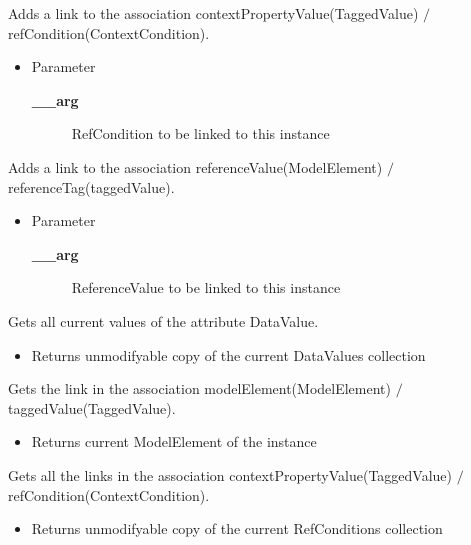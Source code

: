 \begin{desc}Adds a link to the association contextPropertyValue(TaggedValue)
 $/$ refCondition(ContextCondition).
\begin{itemize}
\item{Parameter
  \begin{description}
   \item[{\bf \_\_arg}]{RefCondition to be linked to this instance}
  \end{description}}
\end{itemize}
\end{desc}

\begin{desc}Adds a link to the association referenceValue(ModelElement)
 $/$ referenceTag(taggedValue).
\begin{itemize}
\item{Parameter
  \begin{description}
   \item[{\bf \_\_arg}]{ReferenceValue to be linked to this instance}
  \end{description}}
\end{itemize}
\end{desc}

\begin{desc}Gets all current values of the attribute DataValue.
\begin{itemize}
\item{Returns unmodifyable copy of the current DataValues collection }
\end{itemize}
\end{desc}

\begin{desc}Gets the link in the association modelElement(ModelElement)
 $/$ taggedValue(TaggedValue).
\begin{itemize}
\item{Returns current ModelElement of the instance }
\end{itemize}
\end{desc}

\begin{desc}Gets all the links in the association contextPropertyValue(TaggedValue)
 $/$ refCondition(ContextCondition).
\begin{itemize}
\item{Returns unmodifyable copy of the current RefConditions collection }
\end{itemize}
\end{desc}

